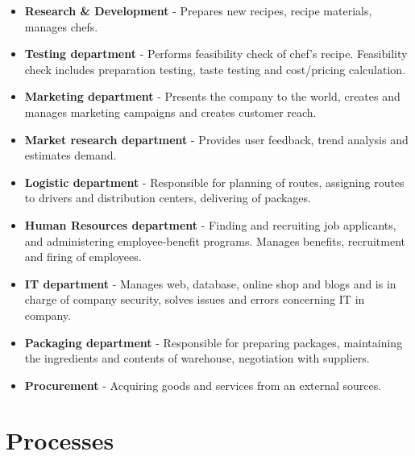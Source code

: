 \documentclass[11pt,a4paper]{article}
\begin{document}
\begin{itemize}
    \item \textbf{Research & Development} - Prepares new recipes, recipe materials, manages chefs.
    \item \textbf{Testing department} - Performs feasibility check of chef’s recipe. Feasibility check includes preparation testing, taste testing and cost/pricing calculation.
    \item \textbf{Marketing department} - Presents the company to the world, creates and manages marketing campaigns and creates customer reach.
    \item \textbf{Market research department} - Provides user feedback, trend analysis and estimates demand.
    \item \textbf{Logistic department} - Responsible for planning of routes, assigning routes to drivers and distribution centers, delivering of packages.
    \item \textbf{Human Resources department} - Finding and recruiting job applicants, and administering employee-benefit programs. Manages benefits, recruitment and firing of employees.
    \item \textbf{IT department} - Manages web, database, online shop and blogs and is in charge of company security, solves issues and errors concerning IT in company.
    \item \textbf{Packaging department} - Responsible for preparing packages, maintaining the ingredients and contents of warehouse, negotiation with suppliers.
    \item \textbf{Procurement} - Acquiring goods and services from an external sources.
\end{itemize}

\section{Processes}
\end{document}
